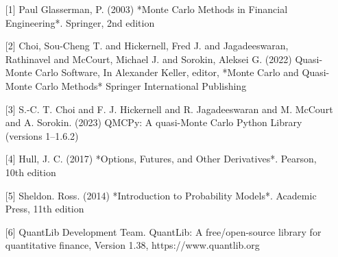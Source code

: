 \documentclass{article}
\begin{document}
\begin{enumerate}
\item[{[1]}]  Paul Glasserman, P. (2003) *Monte Carlo Methods in Financial Engineering*. Springer, 2nd edition
\item[{[2]}]  Choi, Sou-Cheng T.
and Hickernell, Fred J.
and Jagadeeswaran, Rathinavel
and McCourt, Michael J.
and Sorokin, Aleksei G. (2022) Quasi-Monte Carlo Software, In Alexander Keller, editor, *Monte Carlo and Quasi-Monte Carlo Methods* Springer International Publishing
\item[{[3]}] S.-C. T. Choi and F. J. Hickernell and R. Jagadeeswaran and M. McCourt and A. Sorokin. (2023) QMCPy: A quasi-Monte Carlo Python Library (versions 1--1.6.2)
\item[{[4]}]  Hull, J. C. (2017) *Options, Futures, and Other Derivatives*. Pearson, 10th edition
\item[{[5]}]   Sheldon. Ross. (2014) *Introduction to Probability Models*. Academic Press, 11th edition
\item[{[6]}]  QuantLib Development Team. QuantLib: A free/open-source library for quantitative finance, Version 1.38, https://www.quantlib.org
\end{enumerate}
 
\end{document}
